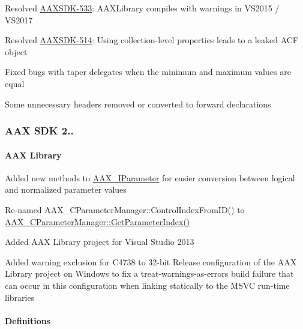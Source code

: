 \begin{DoxyItemize}
\item Resolved \mbox{\hyperlink{a00846_AAXSDK-533}{A\+A\+X\+S\+D\+K-\/533}}\+: A\+A\+X\+Library compiles with warnings in V\+S2015 / V\+S2017  
\item Resolved \mbox{\hyperlink{a00846_AAXSDK-514}{A\+A\+X\+S\+D\+K-\/514}}\+: Using collection-\/level properties leads to a leaked A\+CF object  
\item Fixed bugs with taper delegates when the minimum and maximum values are equal  
\item Some unnecessary headers removed or converted to forward declarations  
\end{DoxyItemize}\hypertarget{a00847_aax_sdk_2p2p2}{}\subsubsection{A\+A\+X S\+D\+K 2..}\label{a00847_aax_sdk_2p2p2}
\hypertarget{a00847_aax_sdk_2p2p2_AAXLibrary}{}\paragraph{A\+A\+X Library}\label{a00847_aax_sdk_2p2p2_AAXLibrary}

\begin{DoxyItemize}
\item Added new methods to \mbox{\hyperlink{a01857}{A\+A\+X\+\_\+\+I\+Parameter}} for easier conversion between logical and normalized parameter values 
\item Re-\/named {\ttfamily A\+A\+X\+\_\+\+C\+Parameter\+Manager\+::\+Control\+Index\+From\+I\+D()} to \mbox{\hyperlink{a01545_ad4322f62f0ea9c9481979db4792715be}{A\+A\+X\+\_\+\+C\+Parameter\+Manager\+::\+Get\+Parameter\+Index()}} 
\item Added A\+AX Library project for Visual Studio 2013 
\item Added warning exclusion for C4738 to 32-\/bit Release configuration of the A\+AX Library project on Windows to fix a treat-\/warnings-\/as-\/errors build failure that can occur in this configuration when linking statically to the M\+S\+VC run-\/time libraries 
\end{DoxyItemize}\hypertarget{a00847_aax_sdk_2p2p2_Definitions}{}\paragraph{Definitions}\label{a00847_aax_sdk_2p2p2_Definitions}

